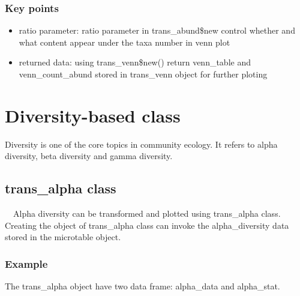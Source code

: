 \documentclass[
]{book}
\newenvironment{Shaded}{\begin{snugshade}}{\end{snugshade}}
\newcommand{\AttributeTok}[1]{\textcolor[rgb]{0.77,0.63,0.00}{#1}}
\newcommand{\CommentTok}[1]{\textcolor[rgb]{0.56,0.35,0.01}{\textit{#1}}}
\newcommand{\DecValTok}[1]{\textcolor[rgb]{0.00,0.00,0.81}{#1}}
\newcommand{\FunctionTok}[1]{\textcolor[rgb]{0.00,0.00,0.00}{#1}}
\newcommand{\NormalTok}[1]{#1}
\newcommand{\OtherTok}[1]{\textcolor[rgb]{0.56,0.35,0.01}{#1}}
\newcommand{\SpecialCharTok}[1]{\textcolor[rgb]{0.00,0.00,0.00}{#1}}
\newcommand{\StringTok}[1]{\textcolor[rgb]{0.31,0.60,0.02}{#1}}
\providecommand{\tightlist}{%
  \setlength{\itemsep}{0pt}\setlength{\parskip}{0pt}}
\begin{document}
\hypertarget{key-points-2}{%
\subsection{Key points}\label{key-points-2}}

\begin{itemize}
\tightlist
\item
  ratio parameter: ratio parameter in trans\_abund\$new control whether and what content appear under the taxa number in venn plot
\item
  returned data: using trans\_venn\$new() return venn\_table and venn\_count\_abund stored in trans\_venn object for further ploting
\end{itemize}

\hypertarget{diversity-based-class}{%
\chapter{Diversity-based class}\label{diversity-based-class}}

Diversity is one of the core topics in community ecology.
It refers to alpha diversity, beta diversity and gamma diversity.

\hypertarget{trans_alpha-class}{%
\section{trans\_alpha class}\label{trans_alpha-class}}

　Alpha diversity can be transformed and plotted using trans\_alpha class.
Creating the object of trans\_alpha class can invoke the alpha\_diversity data stored in the microtable object.

\hypertarget{example-3}{%
\subsection{Example}\label{example-3}}

The trans\_alpha object have two data frame: alpha\_data and alpha\_stat.

\begin{Shaded}
\end{Shaded}
\end{document}
